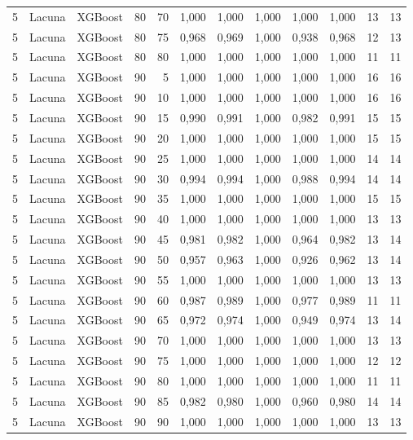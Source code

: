 \begin{longtable}{ccclrrrrrrrr}
5 & Lacuna & XGBoost & 80 & 70 & 1,000 & 1,000 & 1,000 & 1,000 & 1,000 & 13 & 13 \\
5 & Lacuna & XGBoost & 80 & 75 & 0,968 & 0,969 & 1,000 & 0,938 & 0,968 & 12 & 13 \\
5 & Lacuna & XGBoost & 80 & 80 & 1,000 & 1,000 & 1,000 & 1,000 & 1,000 & 11 & 11 \\
5 & Lacuna & XGBoost & 90 & 5 & 1,000 & 1,000 & 1,000 & 1,000 & 1,000 & 16 & 16 \\
5 & Lacuna & XGBoost & 90 & 10 & 1,000 & 1,000 & 1,000 & 1,000 & 1,000 & 16 & 16 \\
5 & Lacuna & XGBoost & 90 & 15 & 0,990 & 0,991 & 1,000 & 0,982 & 0,991 & 15 & 15 \\
5 & Lacuna & XGBoost & 90 & 20 & 1,000 & 1,000 & 1,000 & 1,000 & 1,000 & 15 & 15 \\
5 & Lacuna & XGBoost & 90 & 25 & 1,000 & 1,000 & 1,000 & 1,000 & 1,000 & 14 & 14 \\
5 & Lacuna & XGBoost & 90 & 30 & 0,994 & 0,994 & 1,000 & 0,988 & 0,994 & 14 & 14 \\
5 & Lacuna & XGBoost & 90 & 35 & 1,000 & 1,000 & 1,000 & 1,000 & 1,000 & 15 & 15 \\
5 & Lacuna & XGBoost & 90 & 40 & 1,000 & 1,000 & 1,000 & 1,000 & 1,000 & 13 & 13 \\
5 & Lacuna & XGBoost & 90 & 45 & 0,981 & 0,982 & 1,000 & 0,964 & 0,982 & 13 & 14 \\
5 & Lacuna & XGBoost & 90 & 50 & 0,957 & 0,963 & 1,000 & 0,926 & 0,962 & 13 & 14 \\
5 & Lacuna & XGBoost & 90 & 55 & 1,000 & 1,000 & 1,000 & 1,000 & 1,000 & 13 & 13 \\
5 & Lacuna & XGBoost & 90 & 60 & 0,987 & 0,989 & 1,000 & 0,977 & 0,989 & 11 & 11 \\
5 & Lacuna & XGBoost & 90 & 65 & 0,972 & 0,974 & 1,000 & 0,949 & 0,974 & 13 & 14 \\
5 & Lacuna & XGBoost & 90 & 70 & 1,000 & 1,000 & 1,000 & 1,000 & 1,000 & 13 & 13 \\
5 & Lacuna & XGBoost & 90 & 75 & 1,000 & 1,000 & 1,000 & 1,000 & 1,000 & 12 & 12 \\
5 & Lacuna & XGBoost & 90 & 80 & 1,000 & 1,000 & 1,000 & 1,000 & 1,000 & 11 & 11 \\
5 & Lacuna & XGBoost & 90 & 85 & 0,982 & 0,980 & 1,000 & 0,960 & 0,980 & 14 & 14 \\
5 & Lacuna & XGBoost & 90 & 90 & 1,000 & 1,000 & 1,000 & 1,000 & 1,000 & 13 & 13 \\

\end{longtable}
